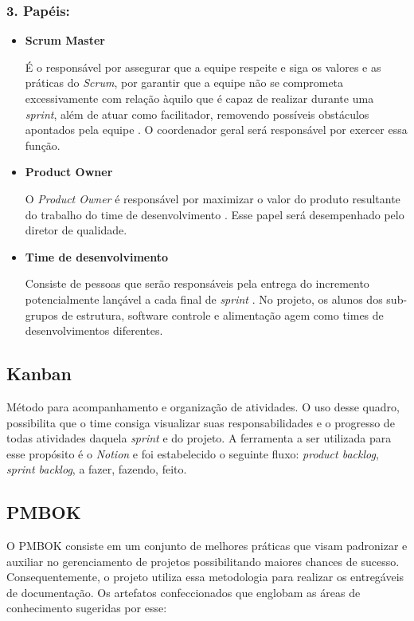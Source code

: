 \subsubsection*{3. Papéis:}
\begin{itemize}
    \item \textbf{Scrum Master}
    
    É o responsável por assegurar que a equipe respeite e siga os valores e as práticas do \textit{Scrum}, por garantir que a equipe não se comprometa excessivamente com relação àquilo que é capaz de realizar durante uma \textit{sprint}, além de atuar como facilitador, removendo possíveis obstáculos apontados pela equipe \cite{DESENVOLVIMENTOAGIL_2013}. O coordenador geral será responsável por exercer essa função.
    
    \item\textbf{Product Owner}
    
    O \textit{Product Owner} é responsável por maximizar o valor do produto resultante do trabalho do time de desenvolvimento \cite{THESCRUMGUIDE_2018}. Esse papel será desempenhado pelo diretor de qualidade.
    
    \item \textbf{Time de desenvolvimento}
    
    Consiste de pessoas que serão responsáveis pela entrega do incremento potencialmente lançável a cada final de \textit{sprint} \cite{THESCRUMGUIDE_2018}. No projeto, os alunos dos sub-grupos de estrutura, software controle e alimentação agem como times de desenvolvimentos diferentes.
\end{itemize}


\subsection{Kanban}

Método para acompanhamento e organização de atividades. O uso desse quadro, possibilita que o time consiga visualizar suas responsabilidades e o progresso de todas atividades daquela \textit{sprint} e do projeto. A ferramenta a ser utilizada para esse propósito é o \textit{Notion} e foi estabelecido o seguinte fluxo: \textit{product backlog}, \textit{sprint backlog}, a fazer, fazendo, feito.

\subsection{PMBOK}

O PMBOK consiste em um conjunto de melhores práticas que visam padronizar e auxiliar no gerenciamento de projetos possibilitando maiores chances de sucesso. Consequentemente, o projeto utiliza essa metodologia para realizar os entregáveis de documentação. Os artefatos confeccionados que englobam as áreas de conhecimento sugeridas por esse:


